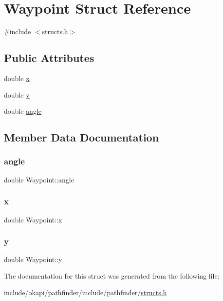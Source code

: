 \hypertarget{structWaypoint}{}\section{Waypoint Struct Reference}
\label{structWaypoint}


{\ttfamily \#include $<$structs.\+h$>$}

\subsection*{Public Attributes}
\begin{DoxyCompactItemize}
\item 
double \mbox{\hyperlink{structWaypoint_a6126f079540befbbedc2b3f5f830c0d1}{x}}
\item 
double \mbox{\hyperlink{structWaypoint_a1790dd445030f6ba5d4932816cd0701f}{y}}
\item 
double \mbox{\hyperlink{structWaypoint_add72ede22a1c3a7474ebf3de1e8d9c78}{angle}}
\end{DoxyCompactItemize}


\subsection{Member Data Documentation}
\mbox{\label{structWaypoint_add72ede22a1c3a7474ebf3de1e8d9c78}} 
\subsubsection{\texorpdfstring{angle}{angle}}
{\footnotesize\ttfamily double Waypoint\+::angle}

\mbox{\label{structWaypoint_a6126f079540befbbedc2b3f5f830c0d1}} 
\subsubsection{\texorpdfstring{x}{x}}
{\footnotesize\ttfamily double Waypoint\+::x}

\mbox{\label{structWaypoint_a1790dd445030f6ba5d4932816cd0701f}} 
\subsubsection{\texorpdfstring{y}{y}}
{\footnotesize\ttfamily double Waypoint\+::y}



The documentation for this struct was generated from the following file\+:\begin{DoxyCompactItemize}
\item 
include/okapi/pathfinder/include/pathfinder/\mbox{\hyperlink{structs_8h}{structs.\+h}}\end{DoxyCompactItemize}
